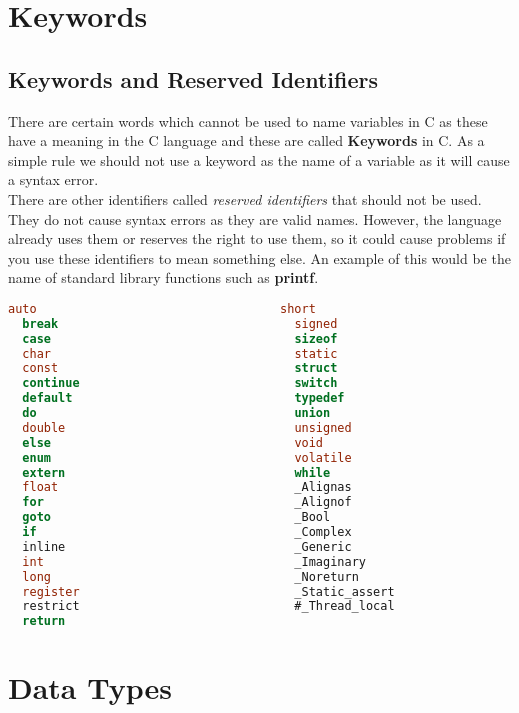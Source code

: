 \documentclass[11pt,a4paper,oneside]{book}
\begin{document}
\chapter{Keywords}
\section{Keywords and Reserved Identifiers}
There are certain words which cannot be used to name variables in C as these
have a meaning in the C language and these are called \textbf{Keywords} in C.
As a simple rule we should not use a keyword as the name of a variable as it
will cause a syntax error.\\

\noindent There are other identifiers called \textit{reserved identifiers} that
should not be used. They do not cause syntax errors as they are valid names. However,
the language already uses them or reserves the right to use them, so it could cause
problems if you use these identifiers to mean something else. An example of this
would be the name of standard library functions such as \textbf{printf}.

\begin{lstlisting}[title=Keywords in C, language=C]
  auto                                  short
  break                                 signed
  case                                  sizeof
  char                                  static	
  const                                 struct
  continue                              switch
  default                               typedef
  do                                    union
  double                                unsigned
  else                                  void
  enum                                  volatile
  extern                                while
  float                                 _Alignas
  for                                   _Alignof
  goto                                  _Bool
  if                                    _Complex
  inline                                _Generic
  int                                   _Imaginary
  long                                  _Noreturn
  register                              _Static_assert
  restrict                              #_Thread_local
  return
\end{lstlisting}

\chapter{Data Types}
\end{document}
